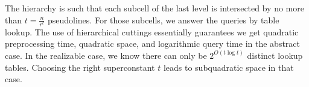\ifeurocg
The hierarchy is such that each subcell of the last level is intersected by no
more than \(t = \frac{n}{r^\ell}\) pseudolines.
For those subcells, we answer the queries by table lookup.
The use of hierarchical cuttings essentially guarantees we get quadratic
preprocessing time, quadratic space, and logarithmic query time in the abstract
case. In the realizable case, we know there can only be \(2^{O(t \log t)}\)
distinct lookup tables. Choosing the right superconstant \(t\) leads to
subquadratic space in that case.
\fi

